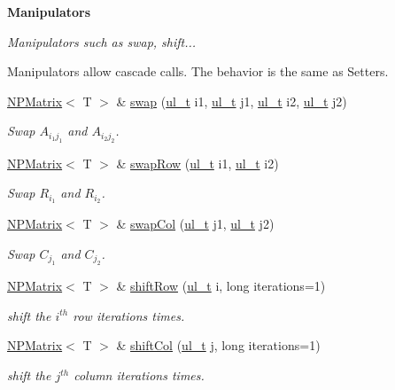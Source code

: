 \begin{Indent}\textbf{ Manipulators}\par
{\em Manipulators such as swap, shift...

Manipulators allow cascade calls. The behavior is the same as Setters. }\begin{DoxyCompactItemize}
\item 
\mbox{\hyperlink{class_n_p_matrix}{N\+P\+Matrix}}$<$ T $>$ \& \mbox{\hyperlink{class_n_p_matrix_a599031f0b0fd352a047f1e87c16e17c6}{swap}} (\mbox{\hyperlink{typedef_8h_a1b140a2034db3f5dfe18a987745df43a}{ul\+\_\+t}} i1, \mbox{\hyperlink{typedef_8h_a1b140a2034db3f5dfe18a987745df43a}{ul\+\_\+t}} j1, \mbox{\hyperlink{typedef_8h_a1b140a2034db3f5dfe18a987745df43a}{ul\+\_\+t}} i2, \mbox{\hyperlink{typedef_8h_a1b140a2034db3f5dfe18a987745df43a}{ul\+\_\+t}} j2)
\begin{DoxyCompactList}\small\item\em Swap $ A_{i_1j_1} $ and $ A_{i_2j_2} $. \end{DoxyCompactList}\item 
\mbox{\hyperlink{class_n_p_matrix}{N\+P\+Matrix}}$<$ T $>$ \& \mbox{\hyperlink{class_n_p_matrix_a85b764f2c21bce5c913c5e0aabb026a1}{swap\+Row}} (\mbox{\hyperlink{typedef_8h_a1b140a2034db3f5dfe18a987745df43a}{ul\+\_\+t}} i1, \mbox{\hyperlink{typedef_8h_a1b140a2034db3f5dfe18a987745df43a}{ul\+\_\+t}} i2)
\begin{DoxyCompactList}\small\item\em Swap $ R_{i_1} $ and $ R_{i_2} $. \end{DoxyCompactList}\item 
\mbox{\hyperlink{class_n_p_matrix}{N\+P\+Matrix}}$<$ T $>$ \& \mbox{\hyperlink{class_n_p_matrix_a0df10f5717511bc15429955244b83ea1}{swap\+Col}} (\mbox{\hyperlink{typedef_8h_a1b140a2034db3f5dfe18a987745df43a}{ul\+\_\+t}} j1, \mbox{\hyperlink{typedef_8h_a1b140a2034db3f5dfe18a987745df43a}{ul\+\_\+t}} j2)
\begin{DoxyCompactList}\small\item\em Swap $ C_{j_1} $ and $ C_{j_2} $. \end{DoxyCompactList}\item 
\mbox{\hyperlink{class_n_p_matrix}{N\+P\+Matrix}}$<$ T $>$ \& \mbox{\hyperlink{class_n_p_matrix_a8927e2dc64af30c6f619a93678332093}{shift\+Row}} (\mbox{\hyperlink{typedef_8h_a1b140a2034db3f5dfe18a987745df43a}{ul\+\_\+t}} i, long iterations=1)
\begin{DoxyCompactList}\small\item\em shift the $ i^{th} $ row {\ttfamily iterations} times. \end{DoxyCompactList}\item 
\mbox{\hyperlink{class_n_p_matrix}{N\+P\+Matrix}}$<$ T $>$ \& \mbox{\hyperlink{class_n_p_matrix_ae039695bf1464be6563f81d6e0c502d8}{shift\+Col}} (\mbox{\hyperlink{typedef_8h_a1b140a2034db3f5dfe18a987745df43a}{ul\+\_\+t}} j, long iterations=1)
\begin{DoxyCompactList}\small\item\em shift the $ j^{th} $ column {\ttfamily iterations} times. \end{DoxyCompactList}\end{DoxyCompactItemize}
\end{Indent}
